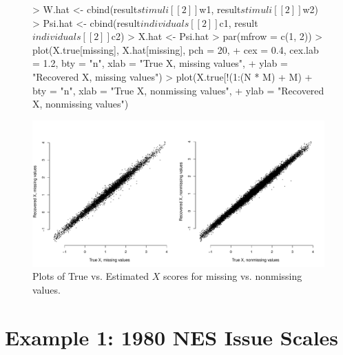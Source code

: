\documentclass[nojss]{jss}
\begin{document}
\begin{figure}
\begin{center}
\begin{Schunk}
\begin{Sinput}
> W.hat <- cbind(result$stimuli[[2]]$w1, result$stimuli[[2]]$w2)
> Psi.hat <- cbind(result$individuals[[2]]$c1, result$individuals[[2]]$c2)
> X.hat <- Psi.hat %
> par(mfrow = c(1, 2))
> plot(X.true[missing], X.hat[missing], pch = 20, 
+     cex = 0.4, cex.lab = 1.2, bty = "n", xlab = "True X, missing values", 
+     ylab = "Recovered X, missing values")
> plot(X.true[!(1:(N * M) %
+     M) %
+     bty = "n", xlab = "True X, nonmissing values", 
+     ylab = "Recovered X, nonmissing values")
\end{Sinput}
\end{Schunk}
\includegraphics{basicspace-nine}
\end{center}
\caption{Plots of True vs. Estimated $X$ scores for missing vs. nonmissing values.}
\label{fig:nine}
\end{figure}


\section{Example 1: 1980 NES Issue Scales}
\end{document}

